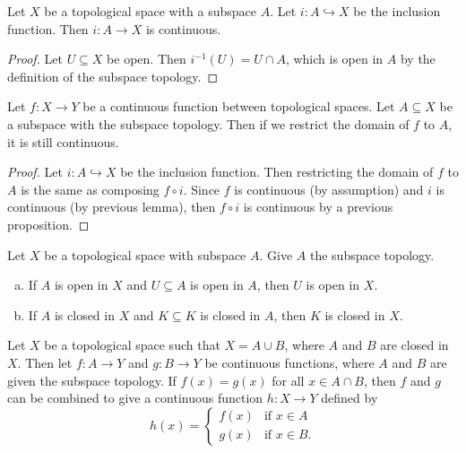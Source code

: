 \documentclass[noname]{notes}
\begin{document}
\begin{lemma}
	Let $X$ be a topological space with a subspace $A$. Let $i \colon A \hookrightarrow X$ be the inclusion function. Then $i \colon A \to X$ is continuous. 
\end{lemma}

\begin{proof}
	Let $U \subseteq X$ be open. Then $i^{-1}(U) = U \cap A$, which is open in $A$ by the definition of the subspace topology. 
\end{proof}

\begin{proposition}
	Let $f \colon X \to Y$ be a continuous function between topological spaces. Let $A \subseteq X$ be a subspace with the subspace topology. Then if we restrict the domain of $f$ to $A$, it is still continuous. 
\end{proposition}

\begin{proof}
	Let $i \colon A \hookrightarrow X$ be the inclusion function. Then restricting the domain of $f$ to $A$ is the same as composing $f \circ i$. Since $f$ is continuous (by assumption) and $i$ is continuous (by previous lemma), then $f \circ i$ is continuous by a previous proposition. 
\end{proof}

\begin{lemma}
	Let $X$ be a topological space with subspace $A$. Give $A$ the subspace topology. 
	\begin{enumerate}[(a)]
		\item If $A$ is open in $X$ and $U \subseteq A$ is open in $A$, then $U$ is open in $X$. 
		\item If $A$ is closed in $X$ and $K \subseteq K$ is closed in $A$, then $K$ is closed in $X$. 
	\end{enumerate}
\end{lemma}

\begin{theorem}[Pasting]
	Let $X$ be a topological space such that $X = A \cup B$, where $A$ and $B$ are closed in $X$. Then let $f \colon A \to Y$ and $g \colon B \to Y$ be continuous functions, where $A$ and $B$ are given the subspace topology. If $f(x) = g(x)$ for all $x \in A \cap B$, then $f$ and $g$ can be combined to give a continuous function $h \colon X \to Y$ defined by 
	\[
		h(x) = 
		\begin{cases}
			f(x) & \text{if\ \ } x \in A \\
			g(x) & \text{if\ \ } x \in B. 
		\end{cases}
	\]
\end{theorem}
\end{document}
